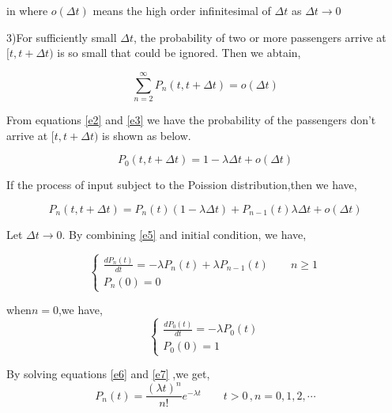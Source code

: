 \documentclass{mcmthesis}
\begin{document}
in where $o(\Delta t)$ means the high order infinitesimal of $\Delta t$ as $\Delta t \rightarrow 0$
\par 3)For sufficiently small $\Delta t$, the probability of two or more  passengers arrive at $[t,t+\Delta t)$ is so small that could be ignored. Then we abtain,
 
\begin{equation}  
\sum\limits_{n=2}^\infty P_n(t,t+\Delta t)=o(\Delta t)   \label{e3}
\end{equation}

From equations \eqref{e2} and  \eqref{e3} we have the probability of the  passengers don't arrive at $[t,t+\Delta t)$ is shown as below.

\begin{equation}
P_0(t,t+\Delta t)=1-\lambda \Delta t+o(\Delta t)
\end{equation}


If the process of input subject to the Poission distribution,then we have,

\begin{equation}
P_n(t,t+\Delta t)=P_n(t)(1-\lambda \Delta t)+P_{n-1}(t)\lambda \Delta t+o(\Delta t) \label{e5}
\end{equation}

Let  $\Delta t \rightarrow 0$. By combining \eqref{e5} and initial condition, we have,

\begin{equation}    \label{e6}
\left\{
       \begin{array}{lr}
           \frac {d P_n(t)}{d t}=-\lambda P_n(t)+\lambda P_{n-1}(t)\qquad n\geqslant 1\\
            P_n(0)=0
        \end{array}
\right.
\end{equation}

when$n=0$,we have,
\begin{equation}    \label{e7}
\left\{
       \begin{array}{lr}
           \frac {d P_0(t)}{d t}=-\lambda P_0(t)\\
            P_0(0)=1
        \end{array}
\right.
\end{equation}


By solving equations \eqref{e6} and \eqref{e7} ,we get,
\begin{equation}
 P_n(t)=\frac{(\lambda t)^n}{n!} e^{-\lambda t}\qquad t>0\, , n=0,1,2,\cdots
\end{equation}
\end{document}
